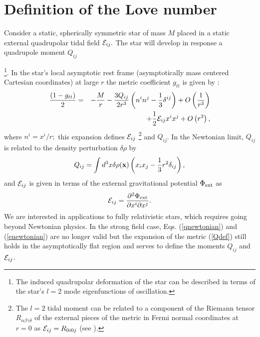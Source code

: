 \documentclass[12pt,preprint]{aastex}
\begin{document}
\section{Definition of the Love number}
\label{sec:lovedef} Consider a static, spherically symmetric star of
mass $M$ placed in a static external quadrupolar tidal field  ${\cal
E}_{ij}.$ The star will develop in response a quadrupole moment
$Q_{ij}$ {\footnote{ The induced quadrupolar deformation of the star
can be described in terms of the star's $l=2$ mode eigenfunctions of
oscillation.}. In the star's local asymptotic rest frame
(asymptotically mass centered Cartesian coordinates) at large $r$
the metric coefficient $g_{tt}$ is given by \citep{Thorne1998}:
\begin{eqnarray} \frac{\left(1-g_{tt} \right)}{2} &=& - {M \over r}- {3Q_{ij}
\over 2 r^3} \left( n^i n^j -
\frac{1}{3}\delta^{ij} \right)+O\left(\frac{1}{r^3}\right)\nonumber\\
& &+\frac{1}{2}{\cal E}_{ij} x^i x^j + O\left(r^3\right),
\label{Qdef} \end{eqnarray} where $n^i=x^i/r;$ this expansion
defines ${\cal E}_{ij}$ \footnote{The $l=2$ tidal moment can be
related to a component of the Riemann tensor
$R_{\alpha\beta\gamma\delta}$ of the external pieces of the metric
in Fermi normal coordinates at $r=0$ as ${\cal E}_{ij}=R_{0i0j}$
(see \citet{mtw}).} and $Q_{ij}$. In the Newtonian limit, $Q_{ij}$
is related to the density perturbation $\delta \rho$ by
\begin{equation} Q_{ij}=\int d^3 x \delta\rho({\bf x}) \left( x_i x_j -
\frac{1}{3}r^2
  \delta_{ij} \right),\label{qnewtonian}\end{equation}
and ${\cal E}_{ij}$ is given in terms of the external gravitational
potential $\Phi_{\rm ext}$ as \begin{equation} {\cal
E}_{ij}=\frac{\partial^2 \Phi_{\rm ext}}{\partial x^i\partial
x^j}.\label{enewtonian}\end{equation} We are interested in
applications to fully relativistic stars, which requires going
beyond Newtonian physics. In the strong field case, Eqs.
(\ref{qnewtonian}) and (\ref{enewtonian}) are no longer valid but
the expansion of the metric (\ref{Qdef}) still holds in the
asymptotically flat region and serves to define the moments $Q_{ij}$
and ${\cal E}_{ij}$.

}
\end{document}
